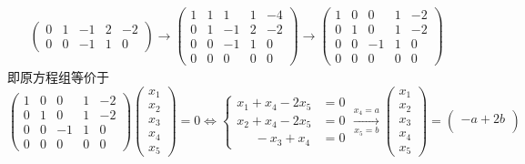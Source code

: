 \documentclass{article}
\begin{document}
\begin{enumerate}
\begin{align*}
\begin{pmatrix}
            0 & 1 &-1 & 2 & -2\\
            0 & 0 &-1 & 1 & 0
        \end{pmatrix}
        \to
        \begin{pmatrix}
            1 & 1 & 1 & 1 & -4\\
            0 & 1 &-1 & 2 & -2\\
            0 & 0 &-1 & 1 & 0\\
            0 & 0 & 0 & 0 & 0
        \end{pmatrix}
        \to
        \begin{pmatrix}
            1 & 0 & 0 & 1 & -2\\
            0 & 1 & 0 & 1 & -2\\
            0 & 0 &-1 & 1 & 0\\
            0 & 0 & 0 & 0 & 0
        \end{pmatrix}
    \end{align*}
    即原方程组等价于
    \[
        \begin{pmatrix}
            1 & 0 & 0 & 1 & -2\\
            0 & 1 & 0 & 1 & -2\\
            0 & 0 &-1 & 1 & 0\\
            0 & 0 & 0 & 0 & 0
        \end{pmatrix}
        \begin{pmatrix}
            x_1\\
            x_2\\
            x_3\\
            x_4\\
            x_5
        \end{pmatrix}=0
        \Leftrightarrow
        \begin{cases}
            x_1 + x_4 - 2x_5 &=0\\
            x_2 + x_4 - 2x_5 &=0\\
            \quad \ \,-x_3 + x_4 &=0
        \end{cases}
        \xrightarrow[x_5=b]{x_4=a}
        \begin{pmatrix}
            x_1\\
            x_2\\
            x_3\\
            x_4\\
            x_5
        \end{pmatrix}=
        \begin{pmatrix}
            -a+2b\\

\end{pmatrix}\]
\end{enumerate}
\end{document}
